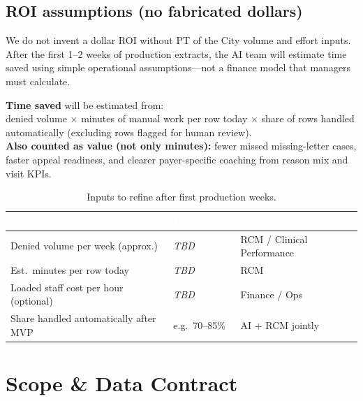 \documentclass[11pt,a4paper]{article}
\begin{document}
\subsection{ROI assumptions (no fabricated dollars)}

We do not invent a dollar ROI without PT of the City volume and effort inputs.
After the first 1--2 weeks of production extracts, the AI team will estimate time saved
using simple operational assumptions---not a finance model that managers must calculate.

\begin{tcolorbox}[infobox,title={ROI assumptions}]
\textbf{Time saved} will be estimated from:\\[0.3em]
denied volume $\times$ minutes of manual work per row today $\times$ share of rows handled
automatically (excluding rows flagged for human review).\\[0.4em]
\textbf{Also counted as value (not only minutes):} fewer missed missing-letter cases,
faster appeal readiness, and clearer payer-specific coaching from reason mix and visit KPIs.
\end{tcolorbox}

\begin{table}[h!]
\centering
\renewcommand{\arraystretch}{1.2}
\begin{tabularx}{\linewidth}{L{5.5cm} C{3.5cm} X}
\toprule
{}
\textcolor{white}{\bfseries Assumption input} &
\textcolor{white}{\bfseries Placeholder} &
\textcolor{white}{\bfseries Owner} \\
\midrule
Denied volume per week (approx.) & \textit{TBD} & RCM / Clinical Performance \\
Est.\ minutes per row today & \textit{TBD} & RCM \\
Loaded staff cost per hour (optional) & \textit{TBD} & Finance / Ops \\
Share handled automatically after MVP & e.g.\ 70--85\% & AI + RCM jointly \\
\bottomrule
\end{tabularx}
\caption{Inputs to refine after first production weeks.}
\end{table}


\section{Scope \& Data Contract}
\end{document}
